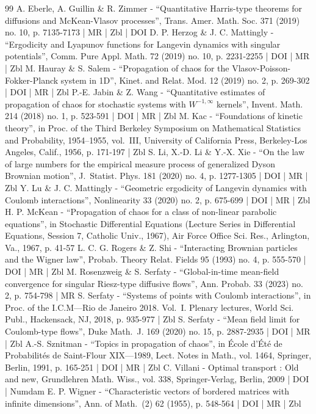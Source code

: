 \documentclass[10pt]{amsart}
\theoremstyle{plain}
\theoremstyle{definition}
\begin{document}
\begin{thebibliography}{99}
A. Eberle, A. Guillin \& R. Zimmer - “Quantitative Harris-type theorems for diffusions and McKean-Vlasov processes”, Trans. Amer. Math. Soc. 371 (2019) no. 10, p. 7135-7173 | MR | Zbl | DOI
D. P. Herzog \& J. C. Mattingly - “Ergodicity and Lyapunov functions for Langevin dynamics with singular potentials”, Comm. Pure Appl. Math. 72 (2019) no. 10, p. 2231-2255 | DOI | MR | Zbl
M. Hauray \& S. Salem - “Propagation of chaos for the Vlasov-Poisson-Fokker-Planck system in 1D”, Kinet. and Relat. Mod. 12 (2019) no. 2, p. 269-302 | DOI | MR | Zbl
P.-E. Jabin \& Z. Wang - “Quantitative estimates of propagation of chaos for stochastic systems with $W^{-1,\infty }$ kernels”, Invent. Math. 214 (2018) no. 1, p. 523-591 | DOI | MR | Zbl
M. Kac - “Foundations of kinetic theory”, in Proc. of the Third Berkeley Symposium on Mathematical Statistics and Probability, 1954–1955, vol. III, University of California Press, Berkeley-Los Angeles, Calif., 1956, p. 171-197 | Zbl
S. Li, X.-D. Li \& Y.-X. Xie - “On the law of large numbers for the empirical measure process of generalized Dyson Brownian motion”, J. Statist. Phys. 181 (2020) no. 4, p. 1277-1305 | DOI | MR | Zbl
Y. Lu \& J. C. Mattingly - “Geometric ergodicity of Langevin dynamics with Coulomb interactions”, Nonlinearity 33 (2020) no. 2, p. 675-699 | DOI | MR | Zbl
H. P. McKean - “Propagation of chaos for a class of non-linear parabolic equations”, in Stochastic Differential Equations (Lecture Series in Differential Equations, Session 7, Catholic Univ., 1967), Air Force Office Sci. Res., Arlington, Va., 1967, p. 41-57
L. C. G. Rogers \& Z. Shi - “Interacting Brownian particles and the Wigner law”, Probab. Theory Relat. Fields 95 (1993) no. 4, p. 555-570 | DOI | MR | Zbl
M. Rosenzweig \& S. Serfaty - “Global-in-time mean-field convergence for singular Riesz-type diffusive flows”, Ann. Probab. 33 (2023) no. 2, p. 754-798 | MR
S. Serfaty - “Systems of points with Coulomb interactions”, in Proc. of the I.C.M—Rio de Janeiro 2018. Vol. I. Plenary lectures, World Sci. Publ., Hackensack, NJ, 2018, p. 935-977 | Zbl
S. Serfaty - “Mean field limit for Coulomb-type flows”, Duke Math. J. 169 (2020) no. 15, p. 2887-2935 | DOI | MR | Zbl
A.-S. Sznitman - “Topics in propagation of chaos”, in École d’Été de Probabilités de Saint-Flour XIX—1989, Lect. Notes in Math., vol. 1464, Springer, Berlin, 1991, p. 165-251 | DOI | MR | Zbl
C. Villani - Optimal transport : Old and new, Grundlehren Math. Wiss., vol. 338, Springer-Verlag, Berlin, 2009 | DOI | Numdam
E. P. Wigner - “Characteristic vectors of bordered matrices with infinite dimensions”, Ann. of Math. (2) 62 (1955), p. 548-564 | DOI | MR | Zbl
\end{thebibliography}
\end{document}
